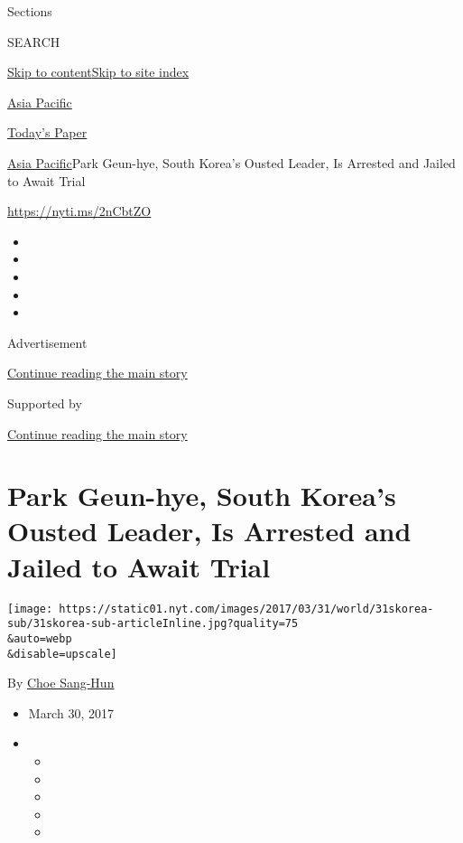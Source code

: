 Sections

SEARCH

\protect\hyperlink{site-content}{Skip to
content}\protect\hyperlink{site-index}{Skip to site index}

\href{https://www.nytimes.com/section/world/asia}{Asia Pacific}

\href{https://myaccount.nytimes.com/auth/login?response_type=cookie\&client_id=vi}{}

\href{https://www.nytimes.com/section/todayspaper}{Today's Paper}

\href{/section/world/asia}{Asia Pacific}\textbar{}Park Geun-hye, South
Korea's Ousted Leader, Is Arrested and Jailed to Await Trial

\url{https://nyti.ms/2nCbtZO}

\begin{itemize}
\item
\item
\item
\item
\item
\end{itemize}

Advertisement

\protect\hyperlink{after-top}{Continue reading the main story}

Supported by

\protect\hyperlink{after-sponsor}{Continue reading the main story}

\hypertarget{park-geun-hye-south-koreas-ousted-leader-is-arrested-and-jailed-to-await-trial}{%
\section{Park Geun-hye, South Korea's Ousted Leader, Is Arrested and
Jailed to Await
Trial}\label{park-geun-hye-south-koreas-ousted-leader-is-arrested-and-jailed-to-await-trial}}

\texttt{[image: https://static01.nyt.com/images/2017/03/31/world/31skorea-sub/31skorea-sub-articleInline.jpg?quality=75\\\&auto=webp\\\&disable=upscale]}

By \href{http://www.nytimes.com/by/choe-sang-hun}{Choe Sang-Hun}

\begin{itemize}
\item
  March 30, 2017
\item
  \begin{itemize}
  \item
  \item
  \item
  \item
  \item
  \end{itemize}
\end{itemize}

